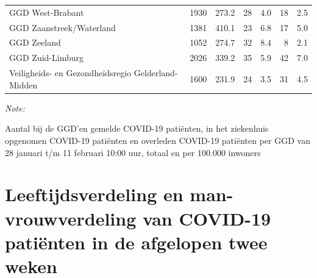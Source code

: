 \documentclass[
  english,
  man,floatsintext]{apa6}
\begin{document}
\begin{table}[H]
\begin{threeparttable}
\begin{tabular}{lrrrrrr}
GGD West-Brabant & 1930 & 273.2 & 28 & 4.0 & 18 & 2.5\\
GGD Zaanstreek/Waterland & 1381 & 410.1 & 23 & 6.8 & 17 & 5.0\\
GGD Zeeland & 1052 & 274.7 & 32 & 8.4 & 8 & 2.1\\
GGD Zuid-Limburg & 2026 & 339.2 & 35 & 5.9 & 42 & 7.0\\
Veiligheids- en Gezondheidsregio Gelderland-Midden & 1600 & 231.9 & 24 & 3.5 & 31 & 4.5\\
\bottomrule
\end{tabular}
\begin{tablenotes}
\item \textit{Note: } 
\item Aantal bij de GGD’en gemelde COVID-19 patiënten, in het ziekenhuis opgenomen COVID-19 patiënten en overleden COVID-19 patiënten per GGD van 28 januari t/m 11 februari 10:00 uur, totaal en per 100.000 inwoners
\end{tablenotes}
\end{threeparttable}
\endgroup{}
\end{table}

\newpage

\hypertarget{leeftijdsverdeling-en-man-vrouwverdeling-van-covid-19-patiuxebnten-in-de-afgelopen-twee-weken}{%
\section{Leeftijdsverdeling en man-vrouwverdeling van COVID-19 patiënten in de afgelopen twee weken}\label{leeftijdsverdeling-en-man-vrouwverdeling-van-covid-19-patiuxebnten-in-de-afgelopen-twee-weken}}
\end{document}
